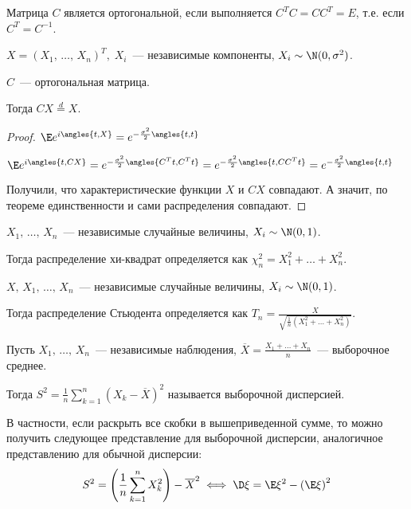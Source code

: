 
\begin{reminder}
	\slashns
	
	Матрица $C$ является ортогональной, если выполняется $C^TC = CC^T = E$, т.е. если $C^T = C^{-1}$.
\end{reminder}

\begin{statement}
	\slashns
	
	$X = (X_1, \, \ldots, \, X_n)^T, \; X_i$~--- независимые компоненты, $X_i \sim \N(0, \sigma^2)$.
	
	$C$~--- ортогональная матрица.
	
	Тогда $CX \overset{d}{=} X$.
	
	\begin{proof}
		\slashns
		
		$\E e^{i \angles{t, X}} = e^{-\frac{\sigma^2}{2} \angles{t, t}}$
		
		$\E e^{i \angles{t, CX}} = e^{-\frac{\sigma^2}{2} \angles{C^Tt, C^Tt}} = e^{-\frac{\sigma^2}{2} \angles{t, CC^Tt}} = e^{-\frac{\sigma^2}{2} \angles{t, t}}$
		
		Получили, что характеристические функции $X$ и $CX$ совпадают. А значит, по теореме единственности и сами распределения совпадают.
	\end{proof}
\end{statement}

\begin{definition}
	\slashns
	
	$X_1, \, \ldots, \, X_n$~--- независимые случайные величины, $X_i \sim \N(0, 1)$.
	
	Тогда распределение хи-квадрат определяется как $\chi_n^2 = X_1^2 + \ldots + X_n^2$.
\end{definition}

\begin{definition}
	\slashns
	
	$X, \, X_1, \, \ldots, \, X_n$~--- независимые случайные величины, $X_i \sim \N(0, 1)$.
	
	Тогда распределение Стьюдента определяется как $T_n = \frac{X}{\sqrt{\frac1n (X_1^2 + \ldots + X_n^2)}}$.
\end{definition}

\begin{definition}
	\slashns
	
	Пусть $X_1, \, \ldots, \, X_n$~--- независимые наблюдения, $\overline{X} = \frac{X_1 + \ldots + X_n}{n}$~--- выборочное среднее.
	
	Тогда $S^2 = \frac1n \sum\limits_{k=1}^{n} (X_k - \overline{X})^2$ называется выборочной дисперсией.
	
	В частности, если раскрыть все скобки в вышеприведенной сумме, то можно получить следующее представление для выборочной дисперсии, аналогичное представлению для обычной дисперсии:
	$$S^2 = \left(\frac1n\sum\limits_{k=1}^{n} X_k^2 \right) - \overline{X}^2 \iff \D \xi = \E \xi^2 - \left(\E \xi\right)^2$$
\end{definition}

